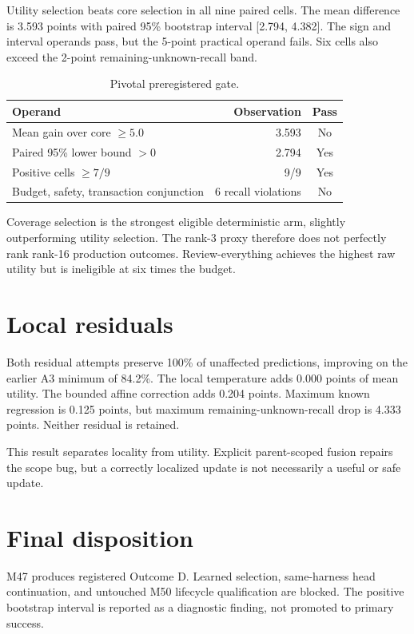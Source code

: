 \documentclass[12pt,oneside]{report}
\begin{document}
Utility selection beats core selection in all nine paired cells. The mean
difference is 3.593 points with paired 95\% bootstrap interval
[2.794, 4.382]. The sign and interval operands pass, but the 5-point practical
operand fails. Six cells also exceed the 2-point remaining-unknown-recall band.

\begin{table}[ht]
\centering
\caption{Pivotal preregistered gate.}
\label{tab:pivotal}
\begin{tabular}{lrc}
\toprule
Operand & Observation & Pass\\
\midrule
Mean gain over core $\geq 5.0$ & 3.593 & No\\
Paired 95\% lower bound $>0$ & 2.794 & Yes\\
Positive cells $\geq 7/9$ & 9/9 & Yes\\
Budget, safety, transaction conjunction & 6 recall violations & No\\
\bottomrule
\end{tabular}
\end{table}

Coverage selection is the strongest eligible deterministic arm, slightly
outperforming utility selection. The rank-3 proxy therefore does not perfectly
rank rank-16 production outcomes. Review-everything achieves the highest raw
utility but is ineligible at six times the budget.

\section{Local residuals}

Both residual attempts preserve 100\% of unaffected predictions, improving on
the earlier A3 minimum of 84.2\%. The local temperature adds 0.000 points of
mean utility. The bounded affine correction adds 0.204 points. Maximum known
regression is 0.125 points, but maximum remaining-unknown-recall drop is 4.333
points. Neither residual is retained.

This result separates locality from utility. Explicit parent-scoped fusion
repairs the scope bug, but a correctly localized update is not necessarily a
useful or safe update.

\section{Final disposition}

M47 produces registered Outcome D. Learned selection, same-harness head
continuation, and untouched M50 lifecycle qualification are blocked. The
positive bootstrap interval is reported as a diagnostic finding, not promoted
to primary success.
\end{document}
